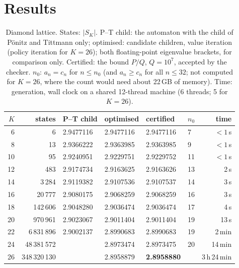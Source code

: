 \documentclass[11pt,a4paper]{report}
\begin{document}
\section{Results}\label{sec:results}

\begin{table}[h]
\centering\small
\caption{Diamond lattice. States: \(|S_K|\). P--T child: the automaton with the child of Pönitz and Tittmann only;
optimised: candidate children, value iteration (policy iteration for \(K=26\)); both floating-point eigenvalue
brackets, for comparison only. Certified: the bound \(P/Q\), \(Q=10^7\), accepted by the checker. \(n_0\): \(a_n=c_n\)
for \(n\le n_0\) (and \(a_n\ge c_n\) for all \(n\le32\); not computed for \(K=26\), where the count would need about 22\,GB of memory). Time: generation, wall clock on a shared 12-thread machine
(6 threads; 5 for \(K=26\)).}\label{tab:dia}
\begin{tabular}{@{}rrllllr@{}}
\toprule
\(K\) & states & P--T child & optimised & certified & \(n_0\) & time \\
\midrule
6 & 6 & 2.9477116 & 2.9477116 & 2.9477116 & 7 & \(<1\)\,s \\
8 & 13 & 2.9366222 & 2.9363985 & 2.9363985 & 9 & \(<1\)\,s \\
10 & 95 & 2.9240951 & 2.9229751 & 2.9229752 & 11 & \(<1\)\,s \\
12 & 483 & 2.9174734 & 2.9163625 & 2.9163626 & 13 & 2\,s \\
14 & 3\,284 & 2.9119382 & 2.9107536 & 2.9107537 & 14 & 3\,s \\
16 & 20\,777 & 2.9080175 & 2.9068259 & 2.9068259 & 16 & 3\,s \\
18 & 142\,606 & 2.9048280 & 2.9036474 & 2.9036474 & 17 & 4\,s \\
20 & 970\,961 & 2.9023067 & 2.9011404 & 2.9011404 & 19 & 13\,s \\
22 & 6\,831\,896 & 2.9002137 & 2.8990683 & 2.8990683 & 19 & 2\,min \\
24 & 48\,381\,572 & & 2.8973474 & 2.8973475 & 20 & 14\,min \\
26 & 348\,320\,130 & & 2.8958879 & \textbf{2.8958880} & & 3\,h\,24\,min \\
\bottomrule
\end{tabular}
\end{table}
\end{document}
